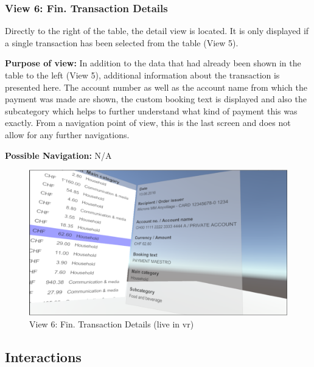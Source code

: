 \subsubsection{View 6: Fin. Transaction Details}

Directly to the right of the table, the detail view is located. It is only displayed if a single transaction has been selected from the table (View 5).

\textbf{Purpose of view:} In addition to the data that had already been shown in the table to the left (View 5), additional information about the transaction is presented here. The account number as well as the account name from which the payment was made are shown, the custom booking text is displayed and also the subcategory which helps to further understand what kind of payment this was exactly. From a navigation point of view, this is the last screen and does not allow for any further navigations.

\textbf{Possible Navigation:} N/A

\begin{figure}[h]
	\begin{center}
		\includegraphics[width=14cm]{03_Figures/08_Development/View6_FinTransactionDetails.png}
		\caption{View 6: Fin. Transaction Details (live in \gls{vr})}
		\label{fig:unityview6}
	\end{center}
\end{figure}


\subsection{Interactions}

